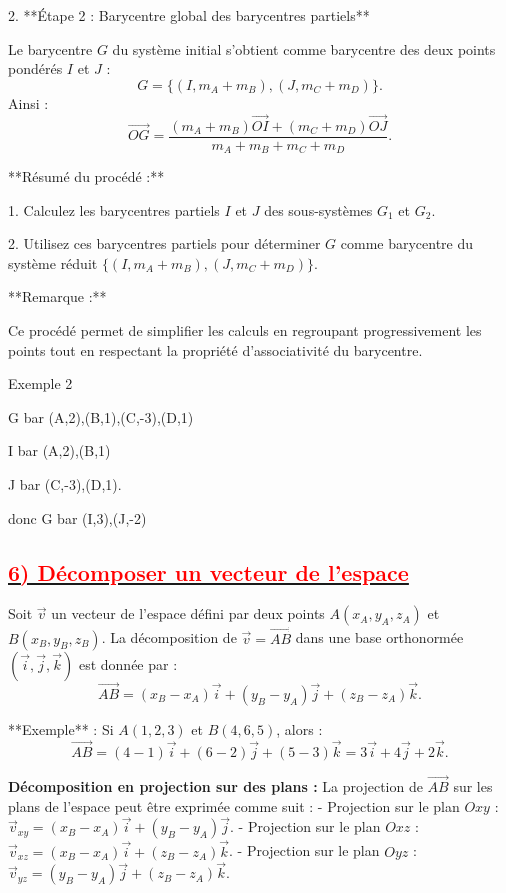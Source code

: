 \documentclass{article}
\begin{document}
2. **Étape 2 : Barycentre global des barycentres partiels**  

   Le barycentre \( G \) du système initial s’obtient comme barycentre des deux points pondérés \( I \) et \( J \) :  
   \[
   G = \{(I, m_A + m_B), (J, m_C + m_D)\}.
   \]
   Ainsi :  
   \[
   \overrightarrow{OG} = \frac{(m_A + m_B) \overrightarrow{OI} + (m_C + m_D) \overrightarrow{OJ}}{m_A + m_B + m_C + m_D}.
   \]

**Résumé du procédé :**  

1. Calculez les barycentres partiels \( I \) et \( J \) des sous-systèmes \( G_1 \) et \( G_2 \). 
 
2. Utilisez ces barycentres partiels pour déterminer \( G \) comme barycentre du système réduit \(\{(I, m_A + m_B), (J, m_C + m_D)\}\).

**Remarque :**  

Ce procédé permet de simplifier les calculs en regroupant progressivement les points tout en respectant la propriété d’associativité du barycentre.

Exemple 2

G bar (A,2),(B,1),(C,-3),(D,1)

I bar (A,2),(B,1)

J bar (C,-3),(D,1).

donc G bar (I,3),(J,-2)

\subsection*{\underline{\textbf{\textcolor{red}{6) Décomposer un vecteur de l’espace}}}}

Soit \( \vec{v} \) un vecteur de l’espace défini par deux points \( A(x_A, y_A, z_A) \) et \( B(x_B, y_B, z_B) \).  
La décomposition de \( \vec{v} = \overrightarrow{AB} \) dans une base orthonormée \((\vec{i}, \vec{j}, \vec{k})\) est donnée par :  
\[
\overrightarrow{AB} = (x_B - x_A) \vec{i} + (y_B - y_A) \vec{j} + (z_B - z_A) \vec{k}.
\]

**Exemple** :  
Si \( A(1, 2, 3) \) et \( B(4, 6, 5) \), alors :  
\[
\overrightarrow{AB} = (4-1)\vec{i} + (6-2)\vec{j} + (5-3)\vec{k} = 3\vec{i} + 4\vec{j} + 2\vec{k}.
\]

\textbf{Décomposition en projection sur des plans :}  
La projection de \( \overrightarrow{AB} \) sur les plans de l’espace peut être exprimée comme suit :
- Projection sur le plan \( Oxy \) : \( \vec{v}_{xy} = (x_B - x_A)\vec{i} + (y_B - y_A)\vec{j} \).
- Projection sur le plan \( Oxz \) : \( \vec{v}_{xz} = (x_B - x_A)\vec{i} + (z_B - z_A)\vec{k} \).
- Projection sur le plan \( Oyz \) : \( \vec{v}_{yz} = (y_B - y_A)\vec{j} + (z_B - z_A)\vec{k} \).
\end{document}
